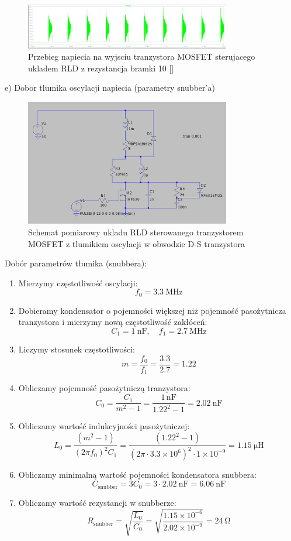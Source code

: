 \documentclass[11pt]{article}
\begin{document}
\begin{figure}[H]
\centering
\includegraphics[width=0.8\textwidth]{aun1_rld_without_snubber_rgate10ohm.png}
\caption{Przebieg napiecia na wyjsciu tranzystora MOSFET sterujacego ukladem RLD z rezystancja bramki 10 [\Omega]}
\end{figure}

e) Dobor tlumika oscylacji napiecia (parametry snubber'a)

\begin{figure}[H]
\centering
\includegraphics[width=0.8\textwidth]{aun1_rld_with_snubber.png}
\caption{Schemat pomiarowy ukladu RLD sterowanego tranzystorem MOSFET z tlumikiem oscylacji w obwodzie D-S tranzystora}
\end{figure}

Dobór parametrów tłumika (snubbera):
\begin{enumerate}
  \item Mierzymy częstotliwość oscylacji:
  \[
  f_0 = \SI{3.3}{\mega\hertz}
  \]
  \item Dobieramy kondensator o pojemności większej niż pojemność pasożytnicza tranzystora i mierzymy nową częstotliwość zakłóceń:
  \[
  C_1 = \SI{1}{\nano\farad}, \quad f_1 = \SI{2.7}{\mega\hertz}
  \]
  \item Liczymy stosunek częstotliwości:
  \[
  m = \frac{f_0}{f_1} = \frac{3.3}{2.7} = 1.22
  \]
  \item Obliczamy pojemność pasożytniczą tranzystora:
  \[
  C_0 = \frac{C_1}{m^2 - 1} = \frac{1\,\text{nF}}{1.22^2 - 1} = \SI{2.02}{\nano\farad}
  \]
  \item Obliczamy wartość indukcyjności pasożytniczej:
  \[
  L_0 = \frac{(m^2 - 1)}{(2\pi f_0)^2 C_1} = \frac{(1.22^2 - 1)}{(2\pi \cdot 3.3 \times 10^6)^2 \cdot 1 \times 10^{-9}} = \SI{1.15}{\micro\henry}
  \]
  \item Obliczamy minimalną wartość pojemności kondensatora snubbera:
  \[
  C_{\text{snubber}} = 3C_0 = 3 \cdot \SI{2.02}{\nano\farad} = \SI{6.06}{\nano\farad}
  \]
  \item Obliczamy wartość rezystancji w snubberze:
  \[
  R_{\text{snubber}} = \sqrt{\frac{L_0}{C_0}} = \sqrt{\frac{1.15 \times 10^{-6}}{2.02 \times 10^{-9}}} = \SI{24}{\ohm}
  \]
\end{enumerate}
\end{document}
